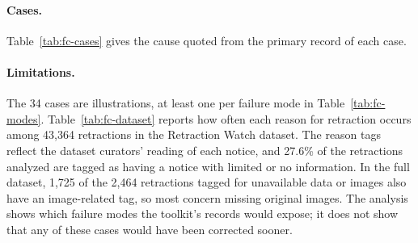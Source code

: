 \paragraph{Cases.} Table~\ref{tab:fc-cases} gives the cause quoted from the primary record of
each case.



\paragraph{Limitations.} The 34 cases are illustrations, at least one per failure mode in Table~\ref{tab:fc-modes}.
Table~\ref{tab:fc-dataset} reports how often each reason for retraction occurs among 43,364
retractions in the Retraction Watch dataset. The reason tags reflect the dataset curators' reading of each notice, and
27.6\% of the retractions analyzed are tagged as having a notice with limited or no information.
In the full dataset, 1,725 of the 2,464 retractions tagged for unavailable data or images also
have an image-related tag, so most concern missing original images. The analysis shows which
failure modes the toolkit's records would expose; it does not show that any of these
cases would have been corrected sooner.
